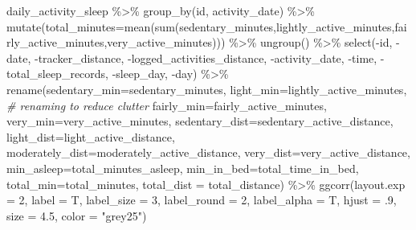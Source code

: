 \documentclass[
]{article}
\newenvironment{Shaded}{\begin{snugshade}}{\end{snugshade}}
\newcommand{\AttributeTok}[1]{\textcolor[rgb]{0.77,0.63,0.00}{#1}}
\newcommand{\CommentTok}[1]{\textcolor[rgb]{0.56,0.35,0.01}{\textit{#1}}}
\newcommand{\DecValTok}[1]{\textcolor[rgb]{0.00,0.00,0.81}{#1}}
\newcommand{\FloatTok}[1]{\textcolor[rgb]{0.00,0.00,0.81}{#1}}
\newcommand{\FunctionTok}[1]{\textcolor[rgb]{0.00,0.00,0.00}{#1}}
\newcommand{\NormalTok}[1]{#1}
\newcommand{\SpecialCharTok}[1]{\textcolor[rgb]{0.00,0.00,0.00}{#1}}
\newcommand{\StringTok}[1]{\textcolor[rgb]{0.31,0.60,0.02}{#1}}
\begin{document}
\begin{Shaded}
\begin{Highlighting}[]
\NormalTok{daily\_activity\_sleep }\SpecialCharTok{\%\textgreater{}\%}
  \FunctionTok{group\_by}\NormalTok{(id, activity\_date) }\SpecialCharTok{\%\textgreater{}\%}
  \FunctionTok{mutate}\NormalTok{(}\AttributeTok{total\_minutes=}\FunctionTok{mean}\NormalTok{(}\FunctionTok{sum}\NormalTok{(sedentary\_minutes,lightly\_active\_minutes,fairly\_active\_minutes,very\_active\_minutes))) }\SpecialCharTok{\%\textgreater{}\%}
  \FunctionTok{ungroup}\NormalTok{() }\SpecialCharTok{\%\textgreater{}\%}
  \FunctionTok{select}\NormalTok{(}\SpecialCharTok{{-}}\NormalTok{id, }\SpecialCharTok{{-}}\NormalTok{date, }\SpecialCharTok{{-}}\NormalTok{tracker\_distance, }\SpecialCharTok{{-}}\NormalTok{logged\_activities\_distance, }\SpecialCharTok{{-}}\NormalTok{activity\_date, }\SpecialCharTok{{-}}\NormalTok{time, }\SpecialCharTok{{-}}\NormalTok{total\_sleep\_records,}
         \SpecialCharTok{{-}}\NormalTok{sleep\_day, }\SpecialCharTok{{-}}\NormalTok{day)  }\SpecialCharTok{\%\textgreater{}\%}
  \FunctionTok{rename}\NormalTok{(}\AttributeTok{sedentary\_min=}\NormalTok{sedentary\_minutes, }\AttributeTok{light\_min=}\NormalTok{lightly\_active\_minutes,            }\CommentTok{\# renaming to reduce clutter}
         \AttributeTok{fairly\_min=}\NormalTok{fairly\_active\_minutes, }\AttributeTok{very\_min=}\NormalTok{very\_active\_minutes,}
         \AttributeTok{sedentary\_dist=}\NormalTok{sedentary\_active\_distance, }\AttributeTok{light\_dist=}\NormalTok{light\_active\_distance,}
         \AttributeTok{moderately\_dist=}\NormalTok{moderately\_active\_distance, }\AttributeTok{very\_dist=}\NormalTok{very\_active\_distance,}
         \AttributeTok{min\_asleep=}\NormalTok{total\_minutes\_asleep, }\AttributeTok{min\_in\_bed=}\NormalTok{total\_time\_in\_bed, }
         \AttributeTok{total\_min=}\NormalTok{total\_minutes, }\AttributeTok{total\_dist =}\NormalTok{ total\_distance) }\SpecialCharTok{\%\textgreater{}\%}
  \FunctionTok{ggcorr}\NormalTok{(}\AttributeTok{layout.exp =} \DecValTok{2}\NormalTok{, }\AttributeTok{label =}\NormalTok{ T, }\AttributeTok{label\_size =} \DecValTok{3}\NormalTok{, }\AttributeTok{label\_round =} \DecValTok{2}\NormalTok{, }\AttributeTok{label\_alpha =}\NormalTok{ T, }\AttributeTok{hjust =}\NormalTok{ .}\DecValTok{9}\NormalTok{, }\AttributeTok{size =} \FloatTok{4.5}\NormalTok{, }\AttributeTok{color =} \StringTok{"grey25"}\NormalTok{)}
\end{Highlighting}
\end{Shaded}
\end{document}
